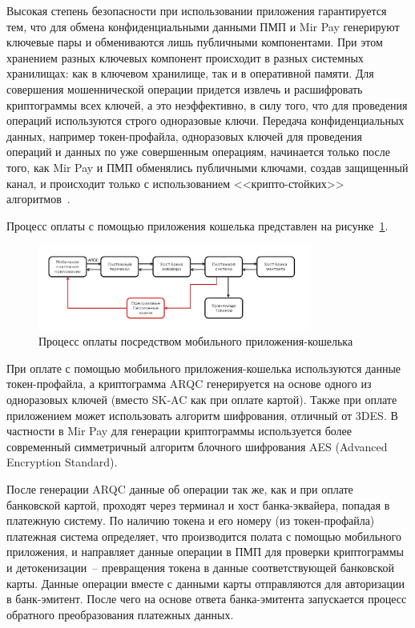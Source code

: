 Высокая степень безопасности при использовании приложения гарантируется тем, что для обмена конфиденциальными данными ПМП и Mir Pay генерируют ключевые пары и обмениваются лишь публичными компонентами.
При этом хранением разных ключевых компонент происходит в разных системных хранилищах: как в ключевом хранилище, так и в оперативной памяти.
Для совершения мошеннической операции придется извлечь и расшифровать криптограммы всех ключей, а это неэффективно, в силу того, что для проведения операций используются строго одноразовые ключи.
Передача конфиденциальных данных, например токен-профайла, одноразовых ключей для проведения операций и данных по уже совершенным операциям, начинается только после того, как Mir Pay и ПМП обменялись публичными ключами, создав защищенный канал, и происходит только с использованием <<крипто-стойких>> алгоритмов~\cite{habr_nspk_mir_payment}.

Процесс оплаты с помощью приложения кошелька представлен на рисунке~\ref{fig:emv_mob_payment}.

\begin{figure}[H]
    \centering
    \includegraphics[width=0.8\textwidth]{images/research/emv_mob_payment}
    \caption{\centering Процесс оплаты посредством мобильного приложения-кошелька}
    \label{fig:emv_mob_payment}
\end{figure}

При оплате с помощью мобильного приложения-кошелька используются данные токен-профайла, а криптограмма ARQC генерируется на основе одного из одноразовых ключей (вместо SK-AC как при оплате картой).
Также при оплате приложением может использовать алгоритм шифрования, отличный от 3DES.
В частности в Mir Pay для генерации криптограммы используется более современный симметричный алгоритм блочного шифрования AES (Advanced Encryption Standard).

После генерации ARQC данные об операции так же, как и при оплате банковской картой, проходят через терминал и хост банка-эквайера, попадая в платежную систему.
По наличию токена и его номеру (из токен-профайла) платежная система определяет, что производится полата с помощью мобильного приложения, и направляет данные операции в ПМП для проверки криптограммы и детокенизации~-- превращения токена в данные соответствующей банковской карты.
Данные операции вместе с данными карты отправляются для авторизации в банк-эмитент.
После чего на основе ответа банка-эмитента запускается процесс обратного преобразования платежных данных.

